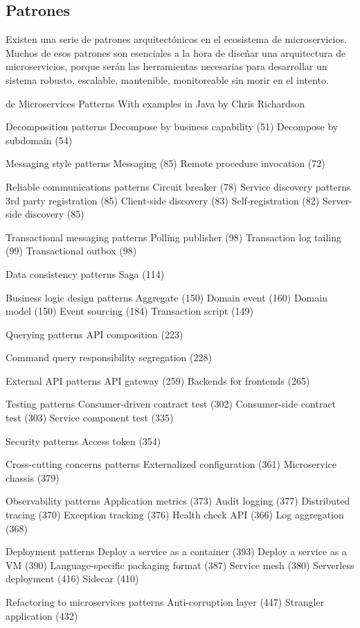\subsection{Patrones}

Existen una serie de patrones arquitectónicos en el ecosistema de microservicios.
Muchos de esos patrones son esenciales a la hora de diseñar una arquitectura de microservicios, porque serán las herramientas
necesarias para desarrollar un sistema robusto, escalable, mantenible, monitoreable sin morir en el intento.

de
Microservices Patterns With examples in Java by Chris Richardson

Decomposition patterns
Decompose by business capability (51)
Decompose by subdomain (54)

Messaging style patterns
Messaging (85)
Remote procedure invocation (72)

Reliable communications patterns
Circuit breaker (78)
Service discovery patterns
3rd party registration (85)
Client-side discovery (83)
Self-registration (82)
Server-side discovery (85)

Transactional messaging patterns
Polling publisher (98)
Transaction log tailing (99)
Transactional outbox (98)

Data consistency patterns
Saga (114)

Business logic design patterns
Aggregate (150)
Domain event (160)
Domain model (150)
Event sourcing (184)
Transaction script (149)

Querying patterns
API composition (223)

Command query responsibility segregation
(228)

External API patterns
API gateway (259)
Backends for frontends (265)

Testing patterns
Consumer-driven contract test (302)
Consumer-side contract test (303)
Service component test (335)

Security patterns
Access token (354)

Cross-cutting concerns patterns
Externalized configuration (361)
Microservice chassis (379)

Observability patterns
Application metrics (373)
Audit logging (377)
Distributed tracing (370)
Exception tracking (376)
Health check API (366)
Log aggregation (368)

Deployment patterns
Deploy a service as a container (393)
Deploy a service as a VM (390)
Language-specific packaging format (387)
Service mesh (380)
Serverless deployment (416)
Sidecar (410)

Refactoring to microservices patterns
Anti-corruption layer (447)
Strangler application (432)
